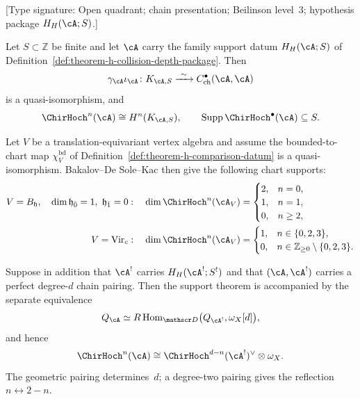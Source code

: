 \begin{theorem}
\label{thm:main-koszul-hoch}

\textup{[Type signature: Open quadrant; chain presentation;
Beilinson level~$3$; hypothesis package \(H_H(\cA;S)\).]}

Let \(S\subset\mathbb Z\) be finite and let \(\cA\) carry the family
support datum \(H_H(\cA;S)\) of
Definition~\ref{def:theorem-h-collision-depth-package}.  Then
\[
 \gamma_\cA\iota_\cA\colon K_{\cA,S}
 \xrightarrow{\ \sim\ }C^\bullet_{\mathrm{ch}}(\cA,\cA)
\]
is a quasi-isomorphism, and
\begin{equation}\label{eq:theorem-h-family-support}
 \ChirHoch^n(\cA)\cong H^n(K_{\cA,S}),
 \qquad
 \operatorname{Supp}\ChirHoch^\bullet(\cA)\subseteq S.
\end{equation}

Let \(V\) be a translation-equivariant vertex algebra and assume the
bounded-to-chart map
\(\chi_V^{\mathrm{bd}}\) of
Definition~\ref{def:theorem-h-comparison-datum} is a
quasi-isomorphism.  Bakalov--De Sole--Kac then give the following
chart supports:
\begin{align*}
 V=B_{\mathfrak h},\quad \dim\mathfrak h_{\bar0}=1,
 \ \mathfrak h_{\bar1}=0
 &:\quad
 \dim\ChirHoch^n(\cA_V)=
 \begin{cases}
 2,&n=0,\\
 1,&n=1,\\
 0,&n\geq2,
 \end{cases}\\
 V=\operatorname{Vir}_c
 &:\quad
 \dim\ChirHoch^n(\cA_V)=
 \begin{cases}
 1,&n\in\{0,2,3\},\\
 0,&n\in\mathbb Z_{\geq0}\setminus\{0,2,3\}.
 \end{cases}
\end{align*}

Suppose in addition that \(\cA^!\) carries
\(H_H(\cA^!;S^!)\) and
that \((\cA,\cA^!)\) carries a perfect degree-\(d\) chain pairing.
Then the support theorem is accompanied by the separate equivalence
\begin{equation}\label{eq:hochschild-H-derived}
 Q_\cA
 \simeq
 R\operatorname{Hom}_{\mathscr D}
 \bigl(Q_{\cA^!},\omega_X[d]\bigr),
\end{equation}
and hence
\[
 \ChirHoch^n(\cA)
 \cong
 \ChirHoch^{d-n}(\cA^!)^\vee\otimes\omega_X.
\]
The geometric pairing determines~\(d\); a degree-two pairing gives
the reflection \(n\leftrightarrow2-n\).
\end{theorem}

